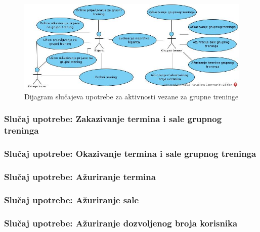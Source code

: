 \documentclass[../main.tex]{subfiles}
\begin{document}
\begin{figure}[!ht]
\begin{center}
\includegraphics[scale=0.47]{sections/images/dijagram_aktivnosti_grupnih_treninga.jpg}
\end{center}
\caption{Dijagram slučajeva upotrebe za aktivnosti vezane za grupne treninge}
\label{fig:kontekst}
\end{figure}

\subsubsection{Slučaj upotrebe: Zakazivanje termina i sale grupnog treninga}


\subsubsection{Slučaj upotrebe: Okazivanje termina i sale grupnog treninga}


\subsubsection{Slučaj upotrebe: Ažuriranje termina}


\subsubsection{Slučaj upotrebe: Ažuriranje sale}


\subsubsection{Slučaj upotrebe: Ažuriranje dozvoljenog broja korisnika}

\end{document}
